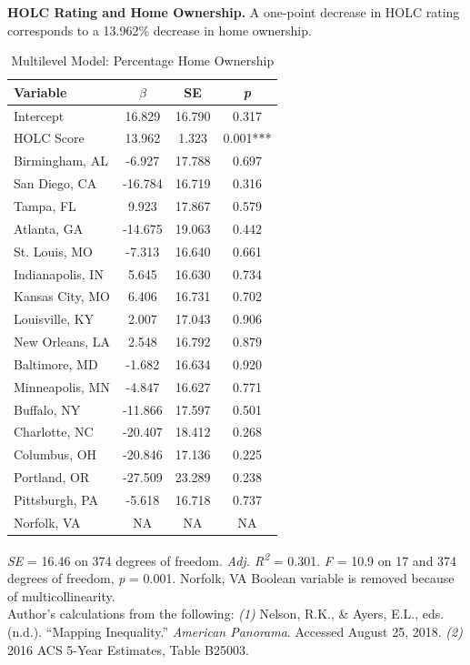 \documentclass[paper=letter, fontsize=12pt]{scrartcl} %
\begin{document}
\begin{table}
	\textbf{HOLC Rating and Home Ownership.} A one-point decrease in HOLC rating corresponds to a 13.962\% decrease in home ownership.
	\caption{Multilevel Model: Percentage Home Ownership}
	\begin{center}
		\begin{tabular}{|| l | c c c ||}
			\hline
			Variable & $\beta$ & SE & \textit{p} \\
			\hline \hline
			Intercept & 16.829 & 16.790 & 0.317\\
			\hline 
			HOLC Score & 13.962 & 1.323 & 0.001***\\
			\hline 
			Birmingham, AL & -6.927 & 17.788 & 0.697\\
			\hline 
			San Diego, CA & -16.784 & 16.719 & 0.316\\ 
			\hline 
			Tampa, FL & 9.923 & 17.867 & 0.579\\
			\hline 
			Atlanta, GA & -14.675 & 19.063 & 0.442\\
			\hline 
			St. Louis, MO & -7.313 & 16.640 & 0.661\\
			\hline 
			Indianapolis, IN & 5.645 & 16.630 & 0.734\\
			\hline 
			Kansas City, MO & 6.406 & 16.731 & 0.702\\
			\hline 
			Louisville, KY & 2.007 & 17.043 & 0.906\\
			\hline 
			New Orleans, LA & 2.548 & 16.792 & 0.879\\
			\hline 
			Baltimore, MD & -1.682 & 16.634 & 0.920\\
			\hline 
			Minneapolis, MN & -4.847 & 16.627 & 0.771\\
			\hline 
			Buffalo, NY & -11.866 & 17.597 & 0.501\\
			\hline 
			Charlotte, NC & -20.407 & 18.412 & 0.268\\
			\hline 
			Columbus, OH & -20.846 & 17.136 & 0.225\\
			\hline 
			Portland, OR & -27.509 & 23.289 & 0.238\\
			\hline 
			Pittsburgh, PA & -5.618 & 16.718 & 0.737\\
			\hline 
			Norfolk, VA & NA & NA & NA\\
			\hline 
		\end{tabular}
	\end{center}
\textit{SE} = 16.46 on 374 degrees of freedom. \textit{Adj. R\textsuperscript{2}} = 0.301. \textit{F} = 10.9 on 17 and 374 degrees of freedom, \textit{p} = 0.001. Norfolk, VA Boolean variable is removed because of multicollinearity.\\
Author's calculations from the following: \textit{(1)} Nelson, R.K., \& Ayers, E.L., eds. (n.d.). ``Mapping Inequality.'' \textit{American Panorama}. Accessed August 25, 2018. \textit{(2)} 2016 ACS 5-Year Estimates, Table B25003.
\end{table}
\end{document}
